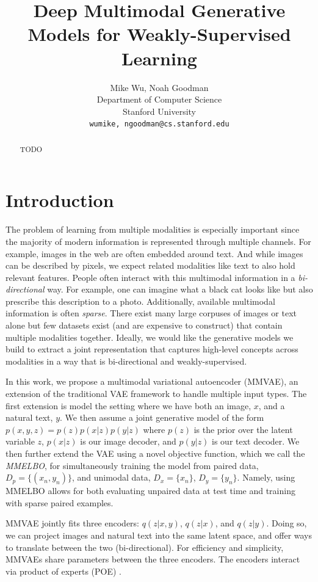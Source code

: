 \documentclass{article}
\title{Deep Multimodal Generative Models for Weakly-Supervised Learning}
\author{
    Mike Wu, Noah Goodman \\
    Department of Computer Science \\
    Stanford University \\
    \texttt{{wumike, ngoodman}@cs.stanford.edu} \\
}
\begin{document}
\maketitle

\begin{abstract}
TODO
\end{abstract}

\section{Introduction}
The problem of learning from multiple modalities is especially important since the majority of modern information is represented through multiple channels. For example, images in the web are often embedded around text. And while images can be described by pixels, we expect related modalities like text to also hold relevant features. People often interact with this multimodal information in a \textit{bi-directional} way. For example, one can imagine what a black cat looks like but also prescribe this description to a photo. Additionally, available multimodal information is often \textit{sparse}. There exist many large corpuses of images or text alone but few datasets exist (and are expensive to construct) that contain multiple modalities together. Ideally, we would like the generative models we build to extract a joint representation that captures high-level concepts across modalities in a way that is bi-directional and weakly-supervised. 

In this work, we propose a multimodal variational autoencoder (MMVAE), an extension of the traditional VAE framework to handle multiple input types. The first extension is model the setting where we have both an image, $x$, and a natural text, $y$. We then assume a joint generative model of the form $p(x, y, z) = p(z)p(x | z)p(y | z)$ where $p(z)$ is the prior over the latent variable $z$, $p(x | z)$ is our image decoder, and $p(y | z)$ is our text decoder. We then further extend the VAE using a novel objective function, which we call the \textit{MMELBO}, for simultaneously training the model from paired data, $D_{p} = \{ (x_{n}, y_{n}) \}$, and unimodal data, $D_{x} = \{ x_{n} \}$, $D_{y} = \{ y_{n} \}$. Namely, using MMELBO allows for both evaluating unpaired data at test time and training with sparse paired examples. 

MMVAE jointly fits three encoders: $q(z | x, y)$, $q(z | x)$, and $q(z | y)$. Doing so, we can project images and natural text into the same latent space, and offer ways to translate between the two (bi-directional). For efficiency and simplicity, MMVAEs share parameters between the three encoders. The encoders interact via product of experts (POE) \cite{hinton2006training, vedantam2017generative}. 
\end{document}
